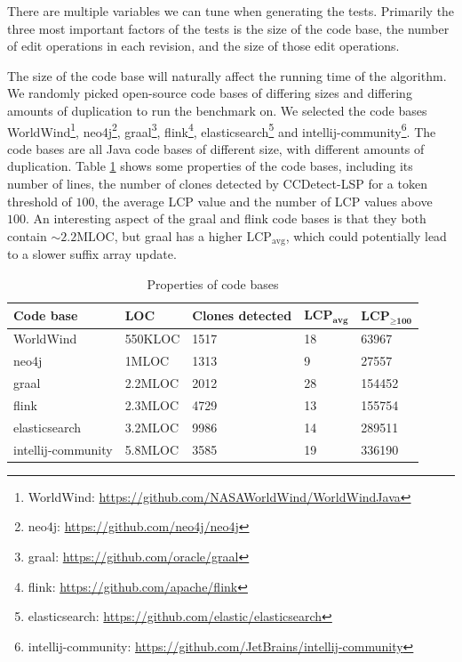 There are multiple variables we can tune when generating the tests. Primarily the three
most important factors of the tests is the size of the code base, the number of edit
operations in each revision, and the size of those edit operations.

The size of the code base will naturally affect the running time of the algorithm. We
randomly picked open-source code bases of differing sizes and differing amounts of
duplication to run the benchmark on. We selected the code bases
WorldWind\footnote{WorldWind: \url{https://github.com/NASAWorldWind/WorldWindJava}},
neo4j\footnote{neo4j: \url{https://github.com/neo4j/neo4j}}, graal\footnote{graal:
\url{https://github.com/oracle/graal}}, flink\footnote{flink:
\url{https://github.com/apache/flink}}, elasticsearch\footnote{elasticsearch:
\url{https://github.com/elastic/elasticsearch}} and
intellij-community\footnote{intellij-community:
\url{https://github.com/JetBrains/intellij-community}}. The code bases are all Java code
bases of different size, with different amounts of duplication. Table \ref{tab:codebases}
shows some properties of the code bases, including its number of lines, the number of
clones detected by CCDetect-LSP for a token threshold of $100$, the average LCP value and
the number of LCP values above $100$. An interesting aspect of the graal and flink code
bases is that they both contain ${\sim}2.2\text{MLOC}$, but graal has a higher
$\text{LCP}_\text{avg}$, which could potentially lead to a slower suffix array update.

\begin{table}[t]
    \begin{center}
        \begin{tabular}[c]{|l|l|l|l|l|}
            \hline
            \textbf{Code base} & \textbf{LOC} & \textbf{Clones detected} &
            $\textbf{LCP}_{\textbf{avg}}$ & $\textbf{LCP}_{\geq \textbf{100}}$ \\
            \hline
            WorldWind & 550KLOC & 1517 & 18 & 63967\\
            \hline
            neo4j & 1MLOC & 1313 & 9 & 27557\\
            \hline
            graal & 2.2MLOC & 2012 & 28 & 154452\\
            \hline
            flink & 2.3MLOC & 4729 & 13 & 155754\\
            \hline
            elasticsearch & 3.2MLOC & 9986 & 14 & 289511 \\
            \hline
            intellij-community & 5.8MLOC & 3585 & 19 & 336190 \\
            \hline
        \end{tabular}
    \end{center}
    \caption{Properties of code bases}
    \label{tab:codebases}
\end{table}

